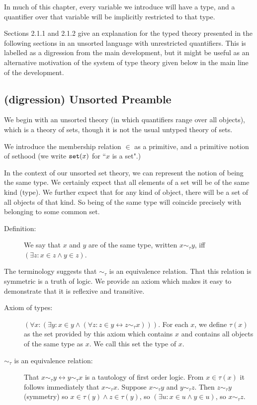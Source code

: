 \documentclass[12pt]{book}
\begin{document}
In much of this chapter, every variable
we introduce will have a type, and a quantifier over that variable
will be implicitly restricted to that type.

Sections 2.1.1 and 2.1.2 give an explanation for the typed theory presented in the following sections in an unsorted language with unrestricted quantifiers.  This is labelled as a digression from the main development, but it might be useful as an alternative motivation of the system of type theory given below in the main line of the development.

\subsection{(digression) Unsorted Preamble}

We begin with an unsorted theory (in which quantifiers range over all objects), which is a theory of sets, though it is not the usual untyped theory of sets.

We introduce the membership relation $\in$ as a primitive, and a primitive notion of sethood (we write ${\tt set}(x)$ for ``$x$ is a set".)

In the context of our unsorted set theory, we can represent the notion of being the same type.  We certainly expect that all elements of a set will be of the same kind (type).
We further expect that for any kind of object, there will be a set of all objects of that kind.  So being of the same type will coincide precisely with belonging to some common set.

\begin{description}

\item[Definition:]  We say that $x$ and $y$ are of the same type, written $x \sim_\tau y$, iff $(\exists z:x \in z \wedge y \in z)$.

\end{description}

The terminology suggests that $\sim_\tau$ is an equivalence relation.  That this relation is symmetric is a truth of logic.  We provide an axiom which makes it easy to demonstrate
that it is reflexive and transitive.

\begin{description}

\item[Axiom of types:]  $(\forall x:(\exists y:x\in y \wedge (\forall z:z \in y \leftrightarrow z \sim_\tau x))).$  For each $x$, we define $\tau(x)$ as the set provided by this
axiom which contains $x$ and contains all objects of the same type as $x$.  We call this set the type of $x$.

\item[$\sim_\tau$ is an equivalence relation:]  That $x \sim_\tau y \leftrightarrow y \sim_\tau x$ is a tautology of first order logic.  From $x \in \tau(x)$ it follows
immediately that $x \sim_\tau x$.  Suppose $x \sim_\tau y$ and $y \sim_\tau z$.  Then $z \sim_\tau y$ (symmetry) so $x \in \tau(y) \wedge z \in \tau(y)$, so
$(\exists u:x \in u \wedge y \in u)$, so $x \sim_\tau z$.

\end{description}
\end{document}
